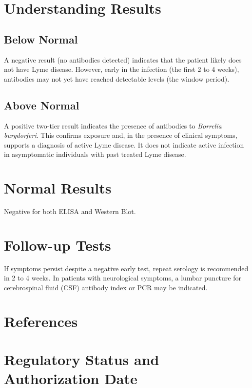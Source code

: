 \section*{Understanding Results}

\subsection*{Below Normal}
A negative result (no antibodies detected) indicates that the patient likely does not have Lyme disease. However, early in the infection (the first 2 to 4 weeks), antibodies may not yet have reached detectable levels (the window period).

\subsection*{Above Normal}
A positive two-tier result indicates the presence of antibodies to \textit{Borrelia burgdorferi}. This confirms exposure and, in the presence of clinical symptoms, supports a diagnosis of active Lyme disease. It does not indicate active infection in asymptomatic individuals with past treated Lyme disease.

\section*{Normal Results}
Negative for both ELISA and Western Blot.

\section*{Follow-up Tests}
If symptoms persist despite a negative early test, repeat serology is recommended in 2 to 4 weeks. In patients with neurological symptoms, a lumbar puncture for cerebrospinal fluid (CSF) antibody index or PCR may be indicated.

\section*{References}



\clearpage
\section*{Regulatory Status and Authorization Date}

\clearpage
